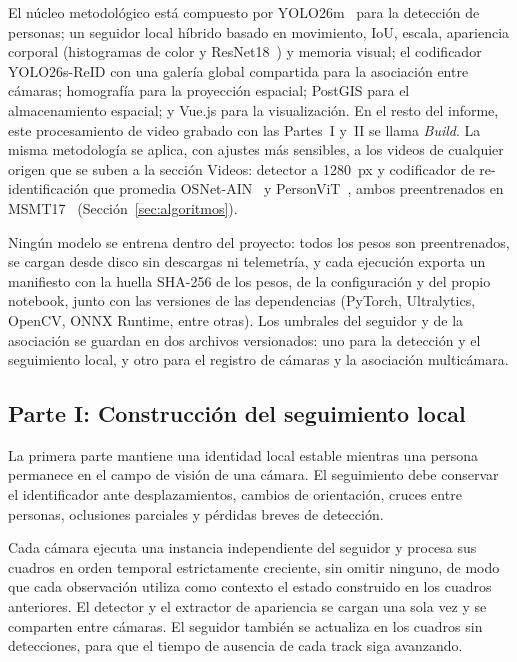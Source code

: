 \documentclass[12pt,a4paper]{article}
\begin{document}
El núcleo metodológico está compuesto por YOLO26m~\cite{yolo26} para la detección de
personas; un seguidor local híbrido basado en movimiento, IoU, escala,
apariencia corporal (histogramas de color y ResNet18~\cite{he2016}) y memoria visual;
el codificador YOLO26s-ReID con una galería global compartida para la
asociación entre cámaras; homografía para la proyección espacial; PostGIS para el almacenamiento espacial; y Vue.js para la visualización.
En el resto del informe, este procesamiento de video grabado con las Partes~I y~II
se llama \textit{Build}. La misma metodología se aplica, con ajustes más sensibles, a los videos de
cualquier origen que se suben a la sección Videos: detector a 1280~px y
codificador de re-identificación que promedia OSNet-AIN~\cite{zhou2022osnet} y PersonViT~\cite{hu2024personvit}, ambos
preentrenados en MSMT17~\cite{wei2018} (Sección~\ref{sec:algoritmos}).

Ningún modelo se entrena dentro del proyecto: todos los pesos son
preentrenados, se cargan desde disco sin descargas ni telemetría, y cada
ejecución exporta un manifiesto con la huella SHA-256 de los pesos, de la
configuración y del propio notebook, junto con las versiones de las
dependencias (PyTorch, Ultralytics, OpenCV, ONNX Runtime, entre otras).
Los umbrales del seguidor y de la asociación se guardan en dos archivos
versionados: uno para la detección y el seguimiento local, y otro para
el registro de cámaras y la asociación multicámara.

\subsection{Parte I: Construcción del seguimiento local}

La primera parte mantiene una identidad local estable mientras una
persona permanece en el campo de visión de una cámara. El seguimiento
debe conservar el identificador ante desplazamientos, cambios de
orientación, cruces entre personas, oclusiones parciales y pérdidas
breves de detección.

Cada cámara ejecuta una instancia independiente del seguidor y procesa
sus cuadros en orden temporal estrictamente creciente, sin omitir
ninguno, de modo que cada observación utiliza como contexto el estado
construido en los cuadros anteriores. El detector y el extractor de
apariencia se cargan una sola vez y se comparten entre cámaras. El
seguidor también se actualiza en los cuadros sin detecciones, para que
el tiempo de ausencia de cada track siga avanzando.
\end{document}
